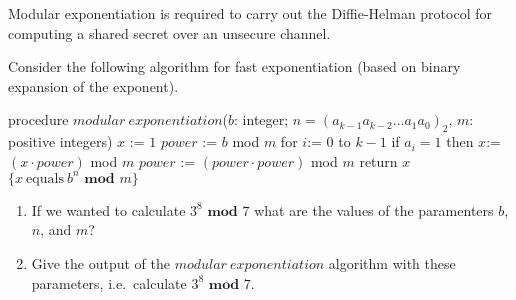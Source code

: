 
Modular exponentiation is required to carry out the Diffie-Helman protocol for 
computing a shared secret over an unsecure channel.

Consider the following algorithm for fast exponentiation (based on binary 
expansion of the exponent).

    \begin{algorithm}[caption={Modular Exponentation}]
    procedure $modular~exponentiation$($b$: integer; 
                 $n = (a_{k-1}a_{k-2} \ldots a_1 a_0)_2$, $m$: positive integers)
    $x$ := $1$
    $power$ := $b$ mod $m$
    for $i$:= $0$ to $k-1$
      if $a_i = 1$ then $x$:= $(x \cdot power)$ mod $m$
      $power$ := $(power \cdot power)$ mod $m$
    return $x$ $\{x~\textrm{equals}~b^n \textbf{ mod } m\} $
    \end{algorithm}
    
    \begin{enumerate}
        \item If we wanted to calculate $3^8 \textbf{ mod } 7$ what are the values of 
        the paramenters $b$, $n$, and $m$? 
        \item Give the output of the $modular~exponentiation$ algorithm 
        with these parameters, i.e.\ calculate $3^8 \textbf{ mod } 7$.
    \end{enumerate}